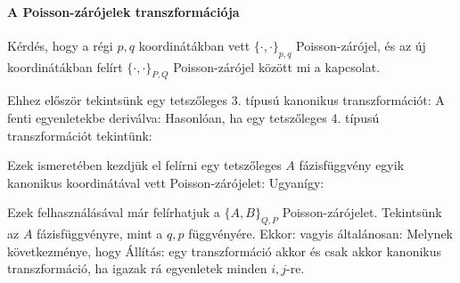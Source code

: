    \paragraph{A Poisson-zárójelek transzformációja}
   Kérdés, hogy a régi $p,q$ koordinátákban vett $\{\cdot,\cdot\}_{p,q}$ Poisson-zárójel, és az új koordinátákban felírt $\{\cdot,\cdot\}_{P,Q}$ Poisson-zárójel között mi a kapcsolat. 
   
   Ehhez először tekintsünk egy tetszőleges 3. típusú kanonikus transzformációt:
   A fenti egyenletekbe deriválva:
   Hasonlóan, ha egy tetszőleges 4. típusú transzformációt tekintünk:
   
   Ezek ismeretében kezdjük el felírni egy tetszőleges $A$ fázisfüggvény egyik kanonikus koordinátával vett Poisson-zárójelet:
   Ugyanígy:
   
   Ezek felhasználásával már felírhatjuk a $\{A,B\}_{Q,P}$ Poisson-zárójelet.
   Tekintsünk az $A$ fázisfüggvényre, mint a $q,p$ függvényére.
   Ekkor:
   vagyis általánosan:
   Melynek következménye, hogy
   Állítás: egy transzformáció akkor és csak akkor kanonikus transzformáció, ha igazak rá  egyenletek minden $i,j$-re. 
   
